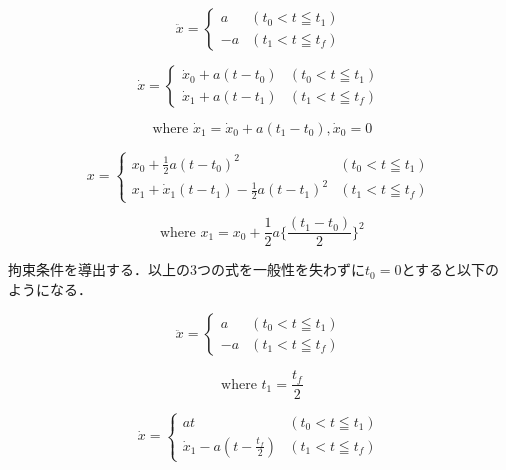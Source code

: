 \begin{equation} 
     \ddot{x} =
     \begin{cases}
          a & ( t_0 < t \leqq t_1 )\\
          -a & ( t_1 < t \leqq t_f )
     \end{cases}
\end{equation}

\begin{equation} 
     \dot{x} =
     \begin{cases}
          \dot{x}_0 + a(t -t_0) & ( t_0 < t \leqq t_1 )\\
          \dot{x}_1 + a(t - t_1) & ( t_1 < t \leqq t_f ) 
     \end{cases}
\end{equation}

\begin{equation}
     \text{ where $\dot{x}_1 = \dot{x}_0 + a(t_1 - t_0), \dot{x}_0 = 0$}\nonumber
\end{equation}

\begin{equation} 
     x =
     \begin{cases}
          x_0 + \frac{1}{2}a(t -t_0)^2 & ( t_0 < t \leqq t_1 )\\
          x_1 + \dot{x}_1(t-t_1) - \frac{1}{2}a(t - t_1)^2 & ( t_1 < t \leqq t_f )
     \end{cases}
\end{equation}

\begin{equation}
     \text{ where $x_1 = x_0 + \frac{1}{2}a\bigg\{\frac{(t_1 - t_0)}{2}\bigg\}^2$}\nonumber
\end{equation}

拘束条件を導出する．以上の3つの式を一般性を失わずに$t_0=0$とすると以下のようになる．

\begin{equation} 
     \ddot{x} =
     \begin{cases}
          a & ( t_0 < t \leqq t_1 )\\
          -a & ( t_1 < t \leqq t_f )
     \end{cases}
\end{equation}

\begin{equation}
     \text{ where $t_1 = \frac{t_f}{2}$}\nonumber
\end{equation}

\begin{equation} 
     \dot{x} =
     \begin{cases}
          at & ( t_0 < t \leqq t_1 )\\
          \dot{x}_1 - a(t - \frac{t_f}{2}) & ( t_1 < t \leqq t_f ) 
     \end{cases}
\end{equation}


